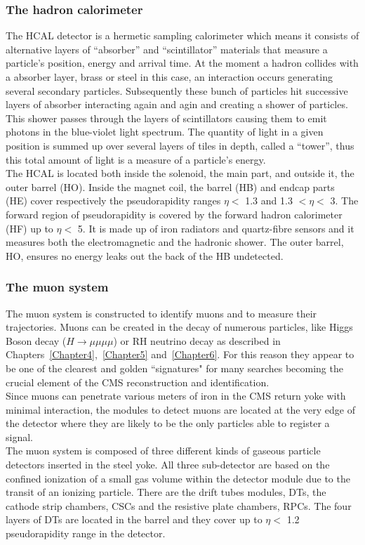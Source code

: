 \subsubsection{The hadron calorimeter}
The HCAL detector is a hermetic sampling calorimeter which means it
consists of alternative layers of ``absorber'' and ``scintillator''
materials that measure a particle’s position, energy and arrival time.
At the moment a hadron collides with a absorber layer, brass or steel
in this case, an interaction occurs generating several secondary
particles. Subsequently these bunch of particles hit successive layers
of absorber interacting again and agin and creating a shower of particles.
This shower passes through the layers of scintillators
causing them to emit photons in the blue-violet light spectrum.
The quantity of light in a given position is summed up over several
layers of tiles in depth, called a “tower”, thus this total amount of
light is a measure of a particle’s energy.\\
The HCAL is located both inside the solenoid, the main part, and
outside it, the outer barrel (HO). 
Inside the magnet coil, the barrel (HB) and endcap parts (HE) cover
respectively the pseudorapidity
ranges $\eta<$ 1.3 and 1.3 $<\eta<$ 3.
The forward region of pseudorapidity is covered by the forward hadron
calorimeter (HF) up to $\eta<$ 5. It is made up of iron radiators and
quartz-fibre sensors and it measures both the electromagnetic and the hadronic shower. 
The outer barrel, HO, ensures no energy leaks out the
back of the HB undetected.

\subsubsection{The muon system}\label{sec:muonsystem}
The muon system is constructed to identify muons and to measure their
trajectories. Muons can be created in the decay of numerous particles,
like Higgs Boson decay ($H \rightarrow \mu \mu \mu \mu$) or 
RH neutrino decay as described in
Chapters~\ref{Chapter4},~\ref{Chapter5} and~\ref{Chapter6}. For this
reason they
appear to be one of the clearest and golden ``signatures" for many
searches becoming the crucial element of the CMS reconstruction
and identification.\\
Since muons can penetrate various meters of iron in the CMS return
yoke with minimal interaction, the modules to detect muons are located at
the very edge of the detector where they are likely to be the only particles
able to register a signal.\\
The muon system is composed of three different kinds of gaseous particle
detectors inserted in the steel yoke. All three sub-detector are
based on the confined ionization of a small gas volume within the detector
module due to the transit of an ionizing particle.
There are the drift tubes
modules, DTs, the cathode strip chambers, CSCs and the resistive plate
chambers, RPCs.
The four layers of DTs are located in the barrel and they cover up to
$\eta<$ 1.2 pseudorapidity range in the detector. 

